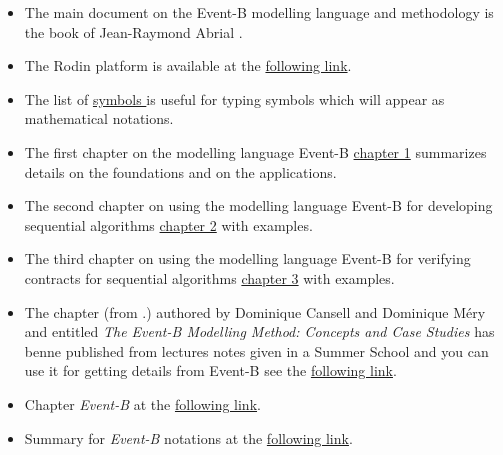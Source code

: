 \documentclass[ 12pt]{article}
\begin{document}
\begin{itemize}

\item[]  The main document on the Event-B  modelling language and
  methodology is the book of Jean-Raymond Abrial \cite{abrial2010}.

  
  
\item[]  The Rodin platform is available at the 
  \href{https://www.event-b.org/install.html}{following 
    link}.


  
\item[]  The list of 
  \href{http://mery54.github.io/teaching/mosos/lecturesnotes/symboles.pdf}{
    symbols } is useful for   typing symbols  which  will appear as 
  mathematical notations.



\item[]  The first chapter on the modelling language Event-B
  \href{http://mery54.github.io/teaching/mosos/lecturesnotes/main-C1.pdf}{chapter
  1} summarizes    details on the foundations and on the applications.


\item[]  The second  chapter on using the modelling language Event-B
  for developing sequential algorithms
  \href{http://mery54.github.io/teaching/mosos/lecturesnotes/main-C2.pdf}{chapter
  2}  with examples.



\item[]  The third  chapter on using the modelling language Event-B
  for verifying contracts for  sequential algorithms
  \href{http://mery54.github.io/teaching/mosos/lecturesnotes/main-fmt.pdf}{chapter
  3}  with examples.


  
\item[]  The chapter \cite{losl-b} (from \cite{losl-eatcs}.)  authored
  by Dominique Cansell and   Dominique Méry and entitled  \textit{The
    Event-B Modelling   Method: Concepts and Case        Studies} has
  benne published from lectures notes given in a Summer School and you can use it for
getting details from  Event-B   see  the  \href{http://mery54.github.io/teaching/mosos/lecturesnotes/BasicEventB.pdf}{following
  link}.




  
\item[]  Chapter   \textit{Event-B} at the 
  \href{http://mery54.github.io/teaching/mosos/lecturesnotes/Chapter10.pdf}{following     link}.



  
\item[]  Summary  for \textit{Event-B}  notations at the 
  \href{http://mery54.github.io/teaching/mosos/lecturesnotes/carte-event-b-en.pdf}{following     link}.



  
\end{itemize}
\end{document}
